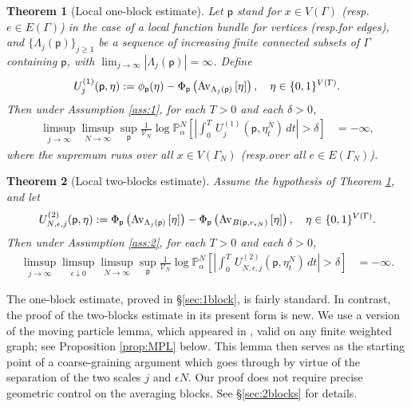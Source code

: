 \documentclass[11pt]{amsart}
\theoremstyle{plain}
\newtheorem{theorem}{Theorem}
\theoremstyle{definition}
\theoremstyle{remark}
\newcommand{\pt}{\mathsf{p}}
\newcommand{\Uone}[1]{U^{(1)}_{{#1}}}
\newcommand{\Utwo}[3]{U^{(2)}_{{#1},{#2},{#3}}}
\newcommand{\avg}[2]{{\rm Av}_{#2}\left[{#1}\right]}
\begin{document}
\begin{theorem}[Local one-block estimate]
\label{thm:1block}
Let $\pt$ stand for $x\in V(\Gamma)$ (resp.\@ $e\in E(\Gamma)$) in the case of a local function bundle for vertices (resp.\@ for edges), and $\{\Lambda_j(\pt)\}_{j\geq 1}$ be a sequence of increasing finite connected subsets of $\Gamma$ containing $\pt$, with $\lim_{j\to\infty} |\Lambda_j(\pt)|=\infty$. Define
\begin{equation}
\Uone{j}(\pt,\eta)  := \phi_\pt(\eta) - \Phi_\pt\left(\avg{\eta}{\Lambda_j(\pt)}\right), \quad \eta\in \{0,1\}^{V(\Gamma)}.
\end{equation}
Then under Assumption \ref{ass:1}, for each $T>0$ and each $\delta>0$,
\begin{align}
\label{1bp} \limsup_{j\to\infty} \limsup_{N\to\infty} \sup_{\pt} \frac{1}{\mathcal{V}_N} \log \mathbb{P}^N_\alpha \left[\left|\int_0^T \, \Uone{j}(\pt,\eta^N_t)\,dt\right|>\delta\right] &=-\infty,
\end{align}
where the supremum runs over all $x\in V(\Gamma_N)$ (resp.\@ over all $e\in E(\Gamma_N)$).
\end{theorem}

\begin{theorem}[Local two-blocks estimate]
\label{thm:2block}
Assume the hypothesis of Theorem \ref{thm:1block}, and let
\begin{align}
\Utwo{N}{\epsilon}{j}(\pt,\eta) := \Phi_\pt\left(\avg{\eta}{\Lambda_j(\pt)}\right) -\Phi_\pt\left(\avg{\eta}{B(\pt, r_{\epsilon N})}\right),\quad \eta\in \{0,1\}^{V(\Gamma)}.
\end{align}
Then under Assumption \ref{ass:2}, for each $T>0$ and each $\delta>0$,
\begin{align}
\label{2bp} \limsup_{j\to\infty} \limsup_{\epsilon\downarrow 0} \limsup_{N\to\infty} \sup_\pt \frac{1}{\mathcal{V}_N} \log \mathbb{P}^N_\alpha \left[\left|\int_0^T \, \Utwo{N}{\epsilon}{j}(\pt,\eta^N_t) \,dt \right|>\delta \right] &=-\infty.
\end{align}
\end{theorem}

The one-block estimate, proved in \S\ref{sec:1block}, is fairly standard. In contrast, the proof of the two-blocks estimate in its present form is new. We use a version of the moving particle lemma, which appeared in \cite{ChenMPL}, valid on any finite weighted graph; see Proposition \ref{prop:MPL} below. This lemma then serves as the starting point of a coarse-graining argument which goes through by virtue of the separation of the two scales $j$ and $\epsilon N$. Our proof does not require precise geometric control on the averaging blocks. See \S\ref{sec:2blocks} for details.
\end{document}
